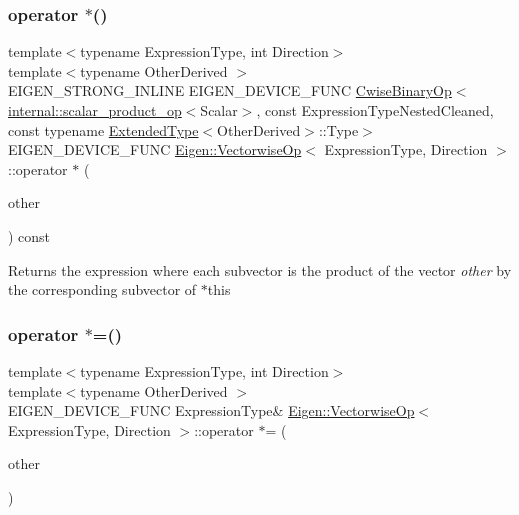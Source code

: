 \subsubsection{\texorpdfstring{operator $\ast$()}{operator *()}}
{\footnotesize\ttfamily template$<$typename Expression\+Type, int Direction$>$ \\
template$<$typename Other\+Derived $>$ \\
E\+I\+G\+E\+N\+\_\+\+S\+T\+R\+O\+N\+G\+\_\+\+I\+N\+L\+I\+NE E\+I\+G\+E\+N\+\_\+\+D\+E\+V\+I\+C\+E\+\_\+\+F\+U\+NC \mbox{\hyperlink{class_eigen_1_1_cwise_binary_op}{Cwise\+Binary\+Op}}$<$\mbox{\hyperlink{struct_eigen_1_1internal_1_1scalar__product__op}{internal\+::scalar\+\_\+product\+\_\+op}}$<$Scalar$>$, const Expression\+Type\+Nested\+Cleaned, const typename \mbox{\hyperlink{struct_eigen_1_1_vectorwise_op_1_1_extended_type}{Extended\+Type}}$<$Other\+Derived$>$\+::Type$>$ E\+I\+G\+E\+N\+\_\+\+D\+E\+V\+I\+C\+E\+\_\+\+F\+U\+NC \mbox{\hyperlink{class_eigen_1_1_vectorwise_op}{Eigen\+::\+Vectorwise\+Op}}$<$ Expression\+Type, Direction $>$\+::operator $\ast$ (\begin{DoxyParamCaption}\item[{const \mbox{\hyperlink{class_eigen_1_1_dense_base}{Dense\+Base}}$<$ Other\+Derived $>$ \&}]{other }\end{DoxyParamCaption}) const\hspace{0.3cm}{\ttfamily [inline]}}

Returns the expression where each subvector is the product of the vector {\itshape other} by the corresponding subvector of {\ttfamily $\ast$this} \mbox{\label{class_eigen_1_1_vectorwise_op_ad83aa84cc84b091fc69b1baaf9cac36e}} 
\subsubsection{\texorpdfstring{operator $\ast$=()}{operator *=()}}
{\footnotesize\ttfamily template$<$typename Expression\+Type, int Direction$>$ \\
template$<$typename Other\+Derived $>$ \\
E\+I\+G\+E\+N\+\_\+\+D\+E\+V\+I\+C\+E\+\_\+\+F\+U\+NC Expression\+Type\& \mbox{\hyperlink{class_eigen_1_1_vectorwise_op}{Eigen\+::\+Vectorwise\+Op}}$<$ Expression\+Type, Direction $>$\+::operator $\ast$= (\begin{DoxyParamCaption}\item[{const \mbox{\hyperlink{class_eigen_1_1_dense_base}{Dense\+Base}}$<$ Other\+Derived $>$ \&}]{other }\end{DoxyParamCaption})\hspace{0.3cm}{\ttfamily [inline]}}

